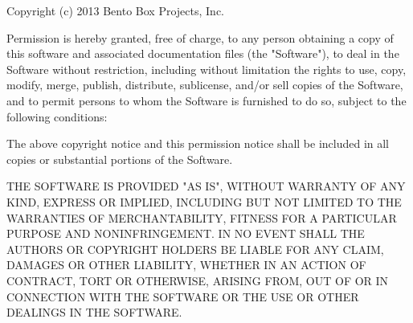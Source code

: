 Copyright (c) 2013 Bento Box Projects, Inc.

Permission is hereby granted, free of charge, to any person obtaining a copy of this software and associated documentation files (the "Software"), to deal in the Software without restriction, including without limitation the rights to use, copy, modify, merge, publish, distribute, sublicense, and/or sell copies of the Software, and to permit persons to whom the Software is furnished to do so, subject to the following conditions:

The above copyright notice and this permission notice shall be included in all copies or substantial portions of the Software.

THE SOFTWARE IS PROVIDED "AS IS", WITHOUT WARRANTY OF ANY KIND, EXPRESS OR IMPLIED, INCLUDING BUT NOT LIMITED TO THE WARRANTIES OF MERCHANTABILITY, FITNESS FOR A PARTICULAR PURPOSE AND NONINFRINGEMENT. IN NO EVENT SHALL THE AUTHORS OR COPYRIGHT HOLDERS BE LIABLE FOR ANY CLAIM, DAMAGES OR OTHER LIABILITY, WHETHER IN AN ACTION OF CONTRACT, TORT OR OTHERWISE, ARISING FROM, OUT OF OR IN CONNECTION WITH THE SOFTWARE OR THE USE OR OTHER DEALINGS IN THE SOFTWARE.
